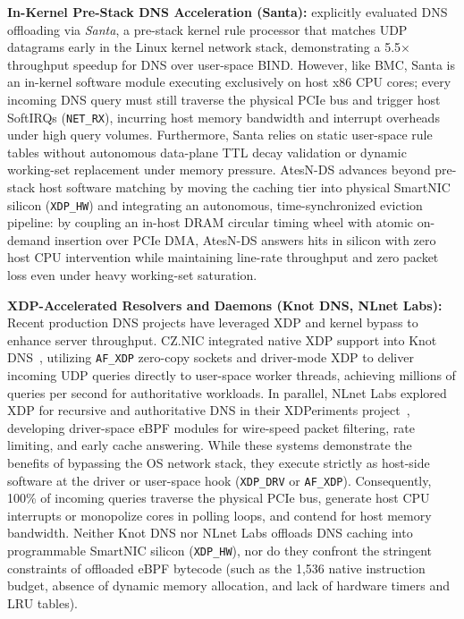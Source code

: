 \documentclass[a4paper,fleqn,colorlinks,hidelinks]{cas-sc}
\begin{document}
\textbf{In-Kernel Pre-Stack DNS Acceleration (Santa):} \citet{8493053} explicitly evaluated DNS offloading via \textit{Santa}, a pre-stack kernel rule processor that matches UDP datagrams early in the Linux kernel network stack, demonstrating a 5.5$\times$ throughput speedup for DNS over user-space BIND. However, like BMC, Santa is an in-kernel software module executing exclusively on host x86 CPU cores; every incoming DNS query must still traverse the physical PCIe bus and trigger host SoftIRQs (\texttt{NET\_RX}), incurring host memory bandwidth and interrupt overheads under high query volumes. Furthermore, Santa relies on static user-space rule tables without autonomous data-plane TTL decay validation or dynamic working-set replacement under memory pressure. AtesN-DS advances beyond pre-stack host software matching by moving the caching tier into physical SmartNIC silicon (\texttt{XDP\_HW}) and integrating an autonomous, time-synchronized eviction pipeline: by coupling an in-host DRAM circular timing wheel with atomic on-demand insertion over PCIe DMA, AtesN-DS answers hits in silicon with zero host CPU intervention while maintaining line-rate throughput and zero packet loss even under heavy working-set saturation.

\textbf{XDP-Accelerated Resolvers and Daemons (Knot DNS, NLnet Labs):} Recent production DNS projects have leveraged XDP and kernel bypass to enhance server throughput. CZ.NIC integrated native XDP support into Knot DNS~\citep{Vackova2021KnotXDP}, utilizing \texttt{AF\_XDP} zero-copy sockets and driver-mode XDP to deliver incoming UDP queries directly to user-space worker threads, achieving millions of queries per second for authoritative workloads. In parallel, NLnet Labs explored XDP for recursive and authoritative DNS in their XDPeriments project~\citep{toorop2021xdperiments}, developing driver-space eBPF modules for wire-speed packet filtering, rate limiting, and early cache answering. While these systems demonstrate the benefits of bypassing the OS network stack, they execute strictly as host-side software at the driver or user-space hook (\texttt{XDP\_DRV} or \texttt{AF\_XDP}). Consequently, 100\% of incoming queries traverse the physical PCIe bus, generate host CPU interrupts or monopolize cores in polling loops, and contend for host memory bandwidth. Neither Knot DNS nor NLnet Labs offloads DNS caching into programmable SmartNIC silicon (\texttt{XDP\_HW}), nor do they confront the stringent constraints of offloaded eBPF bytecode (such as the 1,536 native instruction budget, absence of dynamic memory allocation, and lack of hardware timers and LRU tables).
\end{document}
